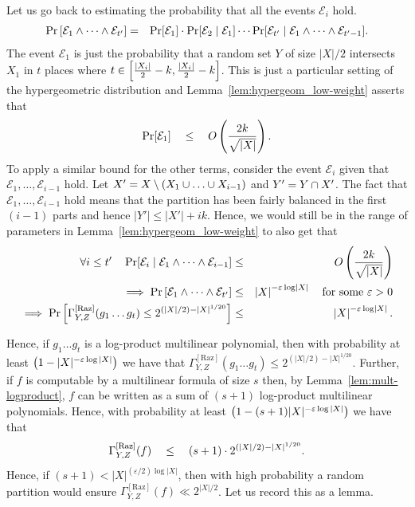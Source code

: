 \documentclass[12pt]{report}
\newcommand{\CM}[1]{\Gamma^{\mathrm{[#1]}}}
\renewcommand{\epsilon}{\varepsilon}
\begin{document}
Let us go back to estimating the probability that all the events $\mathcal{E}_i$ hold.
\begin{eqnarray*}
  \Pr\left[\mathcal{E}_1 \wedge \dots \wedge \mathcal{E}_{t'}\right] & = & \Pr[\mathcal{E}_1] \cdot \Pr[\mathcal{E}_2 \mid \mathcal{E}_1] \cdots \Pr[\mathcal{E}_{t'}\mid \mathcal{E}_1 \wedge \dots \wedge \mathcal{E}_{t'-1}].
\end{eqnarray*}
The event $\mathcal{E}_1$ is just the probability that a random set $Y$ of size $|X|/2$ intersects $X_1$ in $t$ places where $t \in \left[\frac{|X_i|}{2} -k , \frac{|X_i|}{2} -k\right]$. This is just a particular setting of the hypergeometric distribution and Lemma~\ref{lem:hypergeom_low-weight} asserts that
$$
\Pr[\mathcal{E}_1] \quad \leq \quad O\left(\frac{2k}{\sqrt{|X|}}\right).
$$
To apply a similar bound for the other terms, consider the event $\mathcal{E}_i$ given that $\mathcal{E}_1, \dots, \mathcal{E}_{i-1}$ hold. Let $X' = X \setminus (X_1 \union \dots \union X_{i-1})$ and $Y' = Y\cap X'$. The fact that $\mathcal{E}_1,\dots, \mathcal{E}_{i-1}$ hold means that the partition has been fairly balanced in the first $(i-1)$ parts and hence $|Y'| \leq |X'| + ik$. Hence, we would still be in the range of parameters in Lemma~\ref{lem:hypergeom_low-weight} to also get that
\begin{eqnarray*}
  \forall i\leq t'\quad \Pr[\mathcal{E}_i\mid \mathcal{E}_1 \wedge \cdots \wedge \mathcal{E}_{i-1}] &\leq& O\inparen{\frac{2k}{\sqrt{|X|}}}\\
  \implies \Pr\insquare{\mathcal{E}_1\wedge \dots \wedge \mathcal{E}_{t'}} & \leq & \abs{X}^{-\epsilon \log \abs{X}} \quad\text{for some $\epsilon > 0$}  \\
  \implies \Pr\insquare{\CM{Raz}_{Y,Z}(g_1\dots g_t) \leq 2^{(|X|/2) - |X|^{1/20}}} & \leq & \abs{X}^{-\epsilon \log \abs{X}}.
\end{eqnarray*}

\begin{sloppy}
	Hence, if $g_1\dots g_t$ is a log-product multilinear polynomial, 
	then with probability at least $\inparen{1 - |X|^{-\epsilon \log |X|}}$ 
	we have that $\CM{Raz}_{Y,Z}(g_1\dots g_t) \leq 2^{(|X|/2) - |X|^{1/20}}$. 
	Further, if $f$ is computable by a multilinear formula of size $s$ then, 
	by Lemma~\ref{lem:mult-logproduct}, $f$ can be written as a sum of 
	$(s+1)$ log-product multilinear polynomials. Hence, with probability 
	at least $\inparen{1 - (s+1)|X|^{-\epsilon \log |X|}}$ we have that
		$$\CM{Raz}_{Y,Z}(f) \spaced{\leq} (s+1) \cdot 2^{(|X|/2) - |X|^{1/20}}. $$
	Hence, if $(s+1) < |X|^{(\epsilon/2) \log |X|}$, then with high 
	probability a random partition would ensure 
	$\CM{Raz}_{Y,Z}(f) \ll 2^{|X|/2}$. Let us record this as a lemma.
\end{sloppy}
\end{document}
